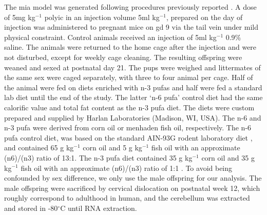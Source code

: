 \documentclass[12pt]{scrbook}
\begin{document}
The \gls{mia} model was generated following procedures previously reported \citep{Li2009c}. 
A dose of 5mg kg$^{-1}$ \gls{polyic} in an injection volume 5ml kg$^{-1}$, prepared on the day of injection was administered to pregnant mice on \gls{gd} 9 via the tail vein under mild physical constraint. 
Control animals received an injection of 5ml kg$^{-1}$ 0.9\% saline. 
The animals were returned to the home cage after the injection and were not disturbed, except for weekly cage cleaning.
The resulting offspring were weaned and sexed at postnatal day 21. 
The pups were weighed and littermates of the same sex were caged separately, with three to four animal per cage.
Half of the animal were fed on diets enriched with n-3 \glspl{pufa} and half were fed a standard  lab diet until the end of the study.
The latter `n-6 \gls{pufa}' control diet had the same calorific value and total fat content as the n-3 \gls{pufa} diet. 
The diets were custom prepared and supplied by Harlan Laboratories (Madison, WI, USA). 
The n-6 and n-3 \gls{pufa} were derived from corn oil or menhaden fish oil, respectively. 
The n-6 \gls{pufa} control diet, was based on the standard AIN-93G rodent laboratory diet \citep{Reeves1993}, and contained 65 g kg$^{-1}$ corn oil and 5 g kg$^{-1}$ fish oil with an approximate (n6)/(n3) ratio of 13:1. 
The n-3 \gls{pufa} diet contained 35 g kg$^{-1}$ corn oil and 35 g kg$^{-1}$ fish oil with an approximate (n6)/(n3) ratio of 1:1 \citep{Olivo2005}.
To avoid being confounded by sex difference, we only use the male offspring for our analysis.
The male offspring were sacrificed by cervical dislocation on postnatal week 12, which roughly correspond to adulthood in human, and the cerebellum was extracted and stored in -80$^{\circ}$C until RNA extraction.
\end{document}

